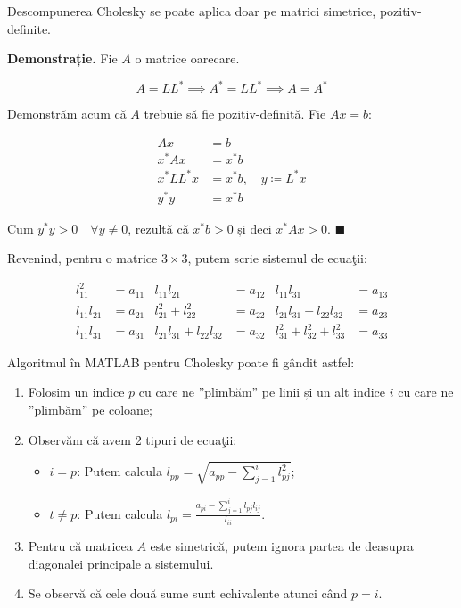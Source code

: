\documentclass{exam}
\begin{document}
\par Descompunerea Cholesky se poate aplica doar pe matrici simetrice,
pozitiv-definite.

\textbf{Demonstrație.} Fie $A$ o matrice oarecare.

\begin{equation*}
	A = LL^* \implies A^* = LL^* \implies A = A^*
\end{equation*}

\par Demonstrăm acum că $A$ trebuie să fie pozitiv-definită. Fie $Ax = b$:

\begin{align*}
	Ax          & = b                             \\
	x^* A x     & = x^* b                         \\
	x^* L L^* x & = x^* b, \quad y \coloneq L^* x \\
	y^* y       & = x^* b
\end{align*}

\par Cum $y^* y > 0 \quad \forall y \neq 0$, rezultă că $x^* b > 0$ și deci
$x^* A x > 0$. $\blacksquare$

\newpage
\par Revenind, pentru o matrice $3 \times 3$, putem scrie sistemul de ecuaţii:

\begin{align*}
	l_{11}^2     & = a_{11} & l_{11}l_{21}                & = a_{12} & l_{11}l_{31}                   & = a_{13} \\
	l_{11}l_{21} & = a_{21} & l_{21}^2 + l_{22}^2         & = a_{22} & l_{21}l_{31} + l_{22}l_{32}    & = a_{23} \\
	l_{11}l_{31} & = a_{31} & l_{21}l_{31} + l_{22}l_{32} & = a_{32} & l_{31}^2 + l_{32}^2 + l_{33}^2 & = a_{33}
\end{align*}

\par Algoritmul în MATLAB pentru Cholesky poate fi gândit astfel:

\begin{enumerate}
	\item Folosim un indice $p$ cu care ne ”plimbăm” pe linii și un alt indice $i$ cu care ne ”plimbăm” pe coloane;
	\item Observăm că avem 2 tipuri de ecuaţii:
	      \begin{itemize}
		      \item $i = p$: Putem calcula $l_{pp} = \sqrt{a_{pp} - \sum_{j = 1}^{i}{l_{pj}^2}}$;
		      \item $t \neq p$: Putem calcula $l_{pi} = \frac{a_{pi} - \sum_{j = 1}^{i}{l_{pj} l_{ij}}}{l_{ii}}$.
	      \end{itemize}
	\item Pentru că matricea $A$ este simetrică, putem ignora partea de deasupra
	      diagonalei principale a sistemului.
	\item Se observă că cele două sume sunt echivalente atunci când $p = i$.
\end{enumerate}
\end{document}
